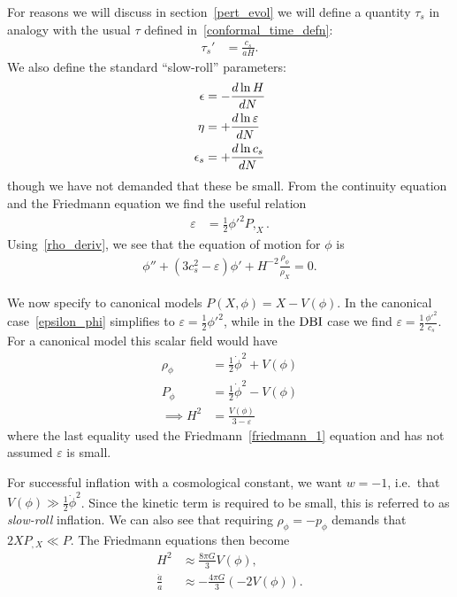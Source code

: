     For reasons we will discuss in section~\ref{pert_evol} we will
    define a quantity $\tau_s$
    in analogy with the usual $\tau$ defined in~\eqref{conformal_time_defn}:
    \begin{align}\label{tausdef}
        \tau_s'&=\frac{c_s}{aH}.
    \end{align}
We also define the standard ``slow-roll'' parameters:
\begin{align}\label{slowrollparams}
    \epsilon &= -\frac{d\ln H}{dN}	\\
    \eta &= +\frac{d\ln \varepsilon}{dN}\\
    \epsilon_s &= +\frac{d\ln c_s}{dN}
\end{align}
though we have not demanded that these be small.
From the continuity equation and the Friedmann equation
we find the useful relation
\begin{align}\label{epsilon_phi}
    \varepsilon &= \frac{1}{2}{\phi'}^2 P,_{X}.
\end{align}
Using~\eqref{rho_deriv}, we see that
the equation of motion for $\phi$ is~\cite{Hu_2011}
\begin{align}\label{phieom}
    \phi''+(3c_s^2-\varepsilon)\phi'+H^{-2}\frac{\rho_\phi}{\rho_X}=0.
\end{align}


We now specify to canonical models $P(X,\phi)=X-V(\phi)$.
In the canonical case~\eqref{epsilon_phi} simplifies to
$\varepsilon = \frac{1}{2}{\phi'}^2$,
while in the $\text{DBI}$ case we find
$\varepsilon = \frac{1}{2}\frac{{\phi'}^2}{c_s}$.
    For a canonical model this scalar field would have
    \begin{align}
        \rho_\phi &= \frac{1}{2}\dot{\phi}^2+V(\phi)\\
        P_\phi &= \frac{1}{2}\dot{\phi}^2-V(\phi)\\
        \implies H^2 &= \frac{V(\phi)}{3-\varepsilon}
    \end{align}
    where the last equality used the Friedmann~\eqref{friedmann_1} equation and
    has not assumed $\varepsilon$ is small.


    For successful inflation with a cosmological constant, we want $w=-1$,
    i.e.\ that $V(\phi)\gg\frac{1}{2}\dot{\phi}^2$. Since the kinetic term is required to
    be small, this is referred to as \textit{slow-roll} inflation.
We can also see that requiring $\rho_\phi=-p_\phi$ demands that
$2XP_{,X}\ll P$.
    The Friedmann equations then become
    \begin{align}
        H^2 &\approx \frac{8\pi G}{3}V(\phi),\\
        \frac{\ddot{a}}{a} &\approx -\frac{4\pi G}{3}\left(-2V(\phi)\right).
    \end{align}

